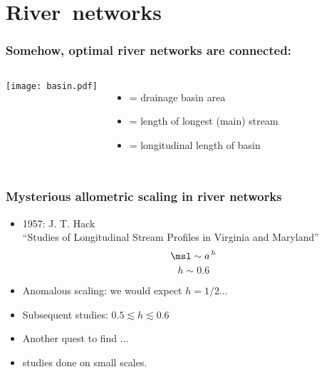 \section{River\ networks}

\begin{frame}[label=]

  \frametitle{Somehow, optimal river networks are connected:}

  \begin{block}{}
  \begin{columns}
    \texttt{[image: basin.pdf]}
    \begin{itemize}
    \item<1-> 
       = drainage basin area
    \item<1-> 
      \alertg{$\msl$} = length of longest (main) stream 
    \item<1-> 
       = longitudinal length of basin
    \end{itemize}
  \end{columns}
  \end{block}

\end{frame}

\begin{frame}
  \frametitle{Mysterious allometric scaling in river networks}

  \begin{block}{}
  \begin{itemize}
  \item<1->
    1957: J. T. Hack\cite{hack1957a}\\
    ``Studies of Longitudinal Stream Profiles in Virginia and Maryland''
    $$
    \msl \sim a^{\, h}
    $$
    $$ h \sim 0.6 $$
  \item<2->
    Anomalous scaling: we would expect $h=1/2$...
  \item<3->
    Subsequent studies: $0.5 \lesssim h \lesssim 0.6 $
  \item<4->
    Another quest to find ...
  \item<5->
     studies done on small scales.
  \end{itemize}
  \end{block}

\end{frame}

